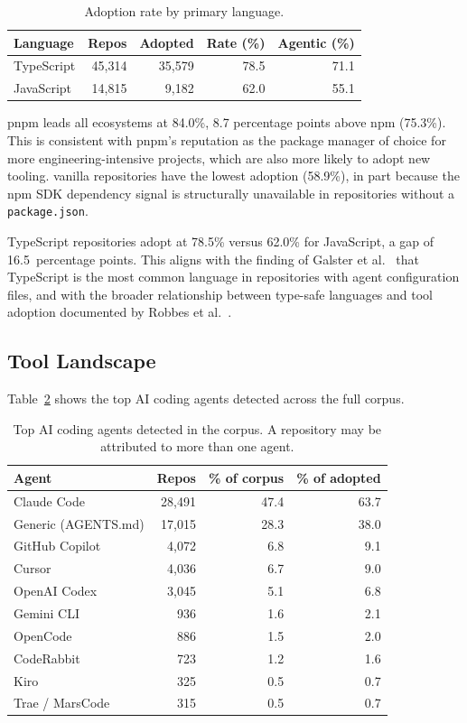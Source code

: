 \begin{table}[h]
\centering
\caption{Adoption rate by primary language.}
\label{tab:breakdown_lang}
\begin{tabular}{@{}lrrrr@{}}
\toprule
Language & Repos & Adopted & Rate (\%) & Agentic (\%) \\
\midrule
TypeScript & 45,314 & 35,579 & 78.5 & 71.1 \\
JavaScript & 14,815 &  9,182 & 62.0 & 55.1 \\
\bottomrule
\end{tabular}
\end{table}

pnpm leads all ecosystems at 84.0\%, 8.7 percentage points above npm (75.3\%). This is consistent with pnpm's reputation as the package manager of choice for more engineering-intensive projects, which are also more likely to adopt new tooling. vanilla repositories have the lowest adoption (58.9\%), in part because the npm SDK dependency signal is structurally unavailable in repositories without a \texttt{package.json}.

TypeScript repositories adopt at 78.5\% versus 62.0\% for JavaScript, a gap of 16.5~percentage points. This aligns with the finding of Galster et al.~\cite{galsterConfig2026} that TypeScript is the most common language in repositories with agent configuration files, and with the broader relationship between type-safe languages and tool adoption documented by Robbes et al.~\cite{robbesAgenticVery2026}.

\subsection{Tool Landscape}

Table~\ref{tab:tool_counts} shows the top AI coding agents detected across the full corpus.

\begin{table}[h]
\centering
\caption{Top AI coding agents detected in the corpus. A repository may be attributed to more than one agent.}
\label{tab:tool_counts}
\begin{tabular}{@{}lrrr@{}}
\toprule
Agent & Repos & \% of corpus & \% of adopted \\
\midrule
Claude Code           & 28,491 & 47.4 & 63.7 \\
Generic (AGENTS.md)   & 17,015 & 28.3 & 38.0 \\
GitHub Copilot        &  4,072 &  6.8 &  9.1 \\
Cursor                &  4,036 &  6.7 &  9.0 \\
OpenAI Codex          &  3,045 &  5.1 &  6.8 \\
Gemini CLI            &    936 &  1.6 &  2.1 \\
OpenCode              &    886 &  1.5 &  2.0 \\
CodeRabbit            &    723 &  1.2 &  1.6 \\
Kiro                  &    325 &  0.5 &  0.7 \\
Trae / MarsCode       &    315 &  0.5 &  0.7 \\
\bottomrule
\end{tabular}
\end{table}

